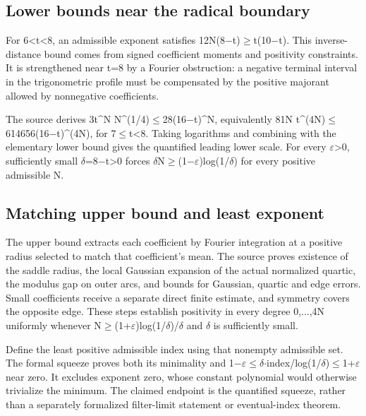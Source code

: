 \documentclass[11pt,a4paper]{article}
\begin{document}
\subsection{Lower bounds near the radical boundary}
For 6<t<8, an admissible exponent satisfies 12N(8\ensuremath{-}t)\ensuremath{\geq}t(10\ensuremath{-}t). This inverse-distance bound comes from signed coefficient moments and positivity constraints. It is strengthened near t=8 by a Fourier obstruction: a negative terminal interval in the trigonometric profile must be compensated by the positive majorant allowed by nonnegative coefficients.

The source derives 3t\textasciicircum{}N N\textasciicircum{}(1/4)\ensuremath{\leq}28(16\ensuremath{-}t)\textasciicircum{}N, equivalently 81N t\textasciicircum{}(4N)\ensuremath{\leq}614656(16\ensuremath{-}t)\textasciicircum{}(4N), for 7\ensuremath{\leq}t<8. Taking logarithms and combining with the elementary lower bound gives the quantified leading lower scale. For every \ensuremath{\varepsilon}>0, sufficiently small \ensuremath{\delta}=8\ensuremath{-}t>0 forces \ensuremath{\delta}N\ensuremath{\geq}(1\ensuremath{-}\ensuremath{\varepsilon})log(1/\ensuremath{\delta}) for every positive admissible N.

\subsection{Matching upper bound and least exponent}
The upper bound extracts each coefficient by Fourier integration at a positive radius selected to match that coefficient's mean. The source proves existence of the saddle radius, the local Gaussian expansion of the actual normalized quartic, the modulus gap on outer arcs, and bounds for Gaussian, quartic and edge errors. Small coefficients receive a separate direct finite estimate, and symmetry covers the opposite edge. These steps establish positivity in every degree 0,...,4N uniformly whenever N\ensuremath{\geq}(1+\ensuremath{\varepsilon})log(1/\ensuremath{\delta})/\ensuremath{\delta} and \ensuremath{\delta} is sufficiently small.

Define the least positive admissible index using that nonempty admissible set. The formal squeeze proves both its minimality and 1\ensuremath{-}\ensuremath{\varepsilon}\ensuremath{\leq}\ensuremath{\delta}\ensuremath{\cdot}index/log(1/\ensuremath{\delta})\ensuremath{\leq}1+\ensuremath{\varepsilon} near zero. It excludes exponent zero, whose constant polynomial would otherwise trivialize the minimum. The claimed endpoint is the quantified squeeze, rather than a separately formalized filter-limit statement or eventual-index theorem.
\end{document}
